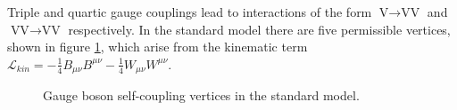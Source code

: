 Triple and quartic gauge couplings lead to interactions of the form $\text{V} \rightarrow \text{VV}$ and $\text{VV} \rightarrow \text{VV}$ respectively.  In the standard model there are five permissible vertices, shown in figure \ref{fig:smtripleandquarticvertices}, which arise from the kinematic term $\mathcal{L}_{kin} = -\frac{1}{4}B_{\mu\nu}B^{\mu\nu} - \frac{1}{4}W_{\mu\nu}W^{\mu\nu}$.
\begin{figure}[h!]
 \hfill
{} 
\caption[Gauge boson self-coupling vertices in the standard model.]{Gauge boson self-coupling vertices in the standard model.}
\label{fig:smtripleandquarticvertices}
\end{figure}


